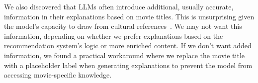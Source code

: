 We also discovered that LLMs often introduce additional, usually accurate, information in their explanations based on movie titles. This is unsurprising given the model's capacity to draw from cultural references~\cite{reynolds2021prompt}. We may not want this information, depending on whether we prefer explanations based on the recommendation system's logic or more enriched content. If we don't want added information, we found a practical workaround where we replace the movie title with a placeholder label when generating explanations to prevent the model from accessing movie-specific knowledge.

